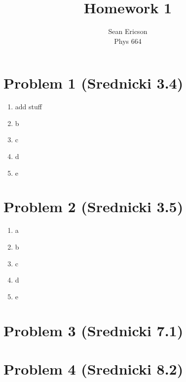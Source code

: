 \documentclass[12pt]{article}
\begin{document}
\title{Homework 1}
\author{Sean Ericson \\ Phys 664}
\maketitle

\section*{Problem 1 \small{(Srednicki 3.4)}}
\begin{enumerate}[label=(\alph*)]
    \item add stuff
    \item b
    \item c
    \item d
    \item e
\end{enumerate}


\section*{Problem 2 \small{(Srednicki 3.5)}}
\begin{enumerate}[label=(\alph*)]
    \item a
    \item b
    \item c
    \item d
    \item e
\end{enumerate}


\section*{Problem 3 \small{(Srednicki 7.1)}}


\section*{Problem 4 \small{(Srednicki 8.2)}}
\end{document}
